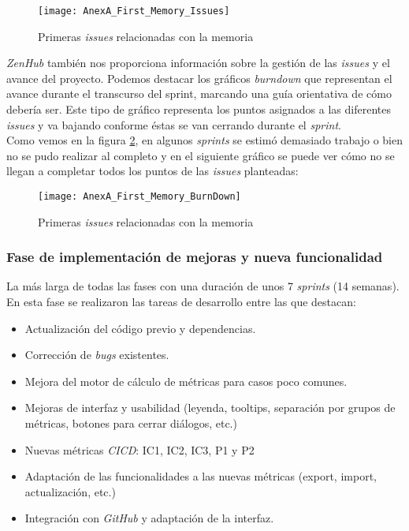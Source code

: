 \begin{figure}[!h]
	\centering
	\texttt{[image: AnexA\_First\_Memory\_Issues]}
	\caption{Primeras \textit{issues} relacionadas con la memoria}
	\label{fig:AnexA_First_Memory_Issues}
\end{figure}
\FloatBarrier

\textit{ZenHub} también nos proporciona información sobre la gestión de las \textit{issues} y el avance del proyecto. Podemos destacar los gráficos \textit{burndown} que representan el avance durante el transcurso del sprint, marcando una guía orientativa de cómo debería ser. Este tipo de gráfico representa los puntos asignados a las diferentes \textit{issues} y va bajando conforme éstas se van cerrando durante el \textit{sprint}. \\
Como vemos en la figura \ref{fig:AnexA_First_Memory_BurnDown}, en algunos \textit{sprints} se estimó demasiado trabajo o bien no se pudo realizar al completo y en el siguiente gráfico se puede ver cómo no se llegan a completar todos los puntos de las \textit{issues} planteadas:

\begin{figure}[!h]
	\centering
	\texttt{[image: AnexA\_First\_Memory\_BurnDown]}
	\caption{Primeras \textit{issues} relacionadas con la memoria}
	\label{fig:AnexA_First_Memory_BurnDown}
\end{figure}
\FloatBarrier

\subsubsection{Fase de implementación de mejoras y nueva funcionalidad}
La más larga de todas las fases con una duración de unos 7 \textit{sprints} (14 semanas). En esta fase se realizaron las tareas de desarrollo entre las que destacan:

\begin{itemize}
	\item Actualización del código previo y dependencias.
	\item Corrección de \textit{bugs}  existentes.
	\item Mejora del motor de cálculo de métricas para casos poco comunes.
	\item Mejoras de interfaz y usabilidad (leyenda, tooltips, separación por grupos de métricas, botones para cerrar diálogos, etc.)
	\item Nuevas métricas \textit{CICD}: IC1, IC2, IC3, P1 y P2
	\item Adaptación de las funcionalidades a las nuevas métricas (export, import, actualización, etc.)
	\item Integración con \textit{GitHub} y adaptación de la interfaz.
\end{itemize}

